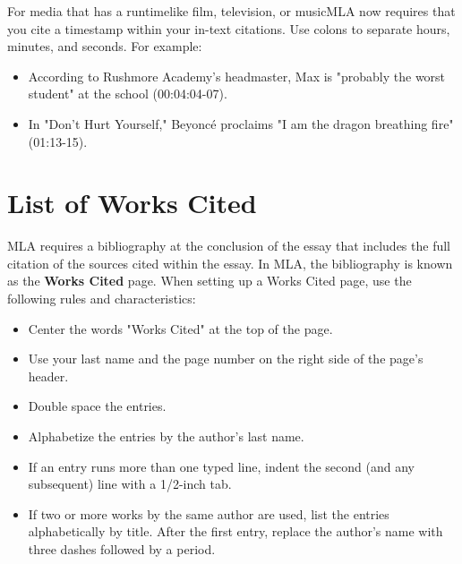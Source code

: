 \bigskip

\begin{tcolorbox}[colframe=oyster, coltitle=black, sharp corners, title=\ding{52} In-text citations for media like film or music. ]

For media that has a runtime\textemdash like film, television, or music\textemdash MLA now requires that you cite a timestamp within your in-text citations. Use colons to separate hours, minutes, and seconds. For example:

\begin{itemize}
\item According to Rushmore Academy's headmaster, Max is "probably the worst student" at the school (00:04:04-07).

\smallskip

\item In "Don't Hurt Yourself," Beyoncé proclaims "I am the dragon breathing fire" (01:13-15).
\end{itemize}

\end{tcolorbox}




\section{List of Works Cited}

MLA requires a bibliography at the conclusion of the essay that includes the full 
citation of the sources cited within the essay. In MLA, the bibliography is known as the 
\textbf{Works Cited} page. When setting up a Works Cited page, use the following rules and 
characteristics:

\begin{itemize}
\item Center the words "Works Cited" at the top of the page.
\item Use your last name and the page number on the right side of the page's header.
\item Double space the entries.
\item Alphabetize the entries by the author's last name.
\item If an entry runs more than one typed line, indent the second (and any subsequent) line with a 1/2-inch tab.
\item If two or more works by the same author are used, list the entries alphabetically by title. After the first entry, replace the author's name with three dashes followed by a period.
\end{itemize}
\newpage

